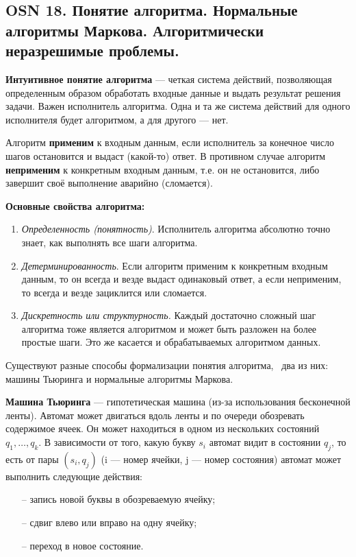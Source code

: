 \subsection{OSN 18. Понятие алгоритма. Нормальные алгоритмы Маркова. Алгоритмически неразрешимые проблемы.}


\textbf{Интуитивное понятие алгоритма} --- четкая система действий, позволяющая определенным образом обработать входные данные и выдать результат решения задачи. Важен исполнитель алгоритма. Одна и та же система действий для одного исполнителя будет алгоритмом, а для другого --- нет.

Алгоритм \textbf{применим} к входным данным, если исполнитель за конечное число шагов остановится и выдаст (какой-то) ответ. В противном случае алгоритм \textbf{неприменим} к конкретным входным данным, т.е. он не остановится, либо завершит своё выполнение аварийно (сломается).

\textbf{Основные свойства алгоритма:}
\begin{enumerate}
    \item\textit{Определенность (понятность)}. Исполнитель алгоритма абсолютно точно знает, как выполнять все шаги алгоритма.
    \item \textit{Детерминированность}. Если алгоритм применим к конкретным входным данным, то он всегда и везде выдаст одинаковый ответ, а если неприменим, то всегда и везде зациклится или сломается.
    \item \textit{Дискретность или структурность.} Каждый достаточно сложный шаг алгоритма тоже является алгоритмом и может быть разложен на более простые шаги. Это же касается и обрабатываемых алгоритмом данных.
\end{enumerate}

Существуют разные способы формализации понятия алгоритма, \faEye \ два из них: машины Тьюринга и нормальные алгоритмы Маркова.


\textbf{Машина Тьюринга} --- гипотетическая машина (из-за использования бесконечной ленты). Автомат может двигаться вдоль ленты и по очереди обозревать содержимое ячеек. Он может находиться в одном из нескольких состояний $q_1,\dots, q_k$. В зависимости от того, какую букву $s_i$ автомат видит в состоянии $q_j$, то есть от пары $(s_i,q_j)$ (i --- номер ячейки, j --- номер состояния) автомат может выполнить следующие действия:
\begin{itemize}
    \item[--] запись новой буквы в обозреваемую ячейку; 
    \item[--] сдвиг влево или вправо на одну ячейку;
    \item[--] переход в новое состояние.
\end{itemize}


